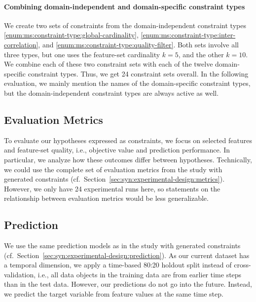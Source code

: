 \paragraph{Combining domain-independent and domain-specific constraint types}

We create two sets of constraints from the domain-independent constraint types \ref{enum:ms:constraint-type:global-cardinality}, \ref{enum:ms:constraint-type:inter-correlation}, and \ref{enum:ms:constraint-type:quality-filter}.
Both sets involve all three types, but one uses the feature-set cardinality $k=5$, and the other $k=10$.
We combine each of these two constraint sets with each of the twelve domain-specific constraint types.
Thus, we get 24 constraint sets overall.
In the following evaluation, we mainly mention the names of the domain-specific constraint types, but the domain-independent constraint types are always active as well.

\subsection{Evaluation Metrics}
\label{sec:ms:experimental-design:metrics}

To evaluate our hypotheses expressed as constraints, we focus on selected features and feature-set quality, i.e., objective value and prediction performance.
In particular, we analyze how these outcomes differ between hypotheses.
Technically, we could use the complete set of evaluation metrics from the study with generated constraints (cf.~Section~\ref{sec:syn:experimental-design:metrics}).
However, we only have 24 experimental runs here, so statements on the relationship between evaluation metrics would be less generalizable.

\subsection{Prediction}
\label{sec:ms:experimental-design:prediction}

We use the same prediction models as in the study with generated constraints (cf.~Section~\ref{sec:syn:experimental-design:prediction}).
As our current dataset has a temporal dimension, we apply a time-based 80:20 holdout split instead of cross-validation,
i.e., all data objects in the training data are from earlier time steps than in the test data.
However, our predictions do not go into the future.
Instead, we predict the target variable from feature values at the same time step.

